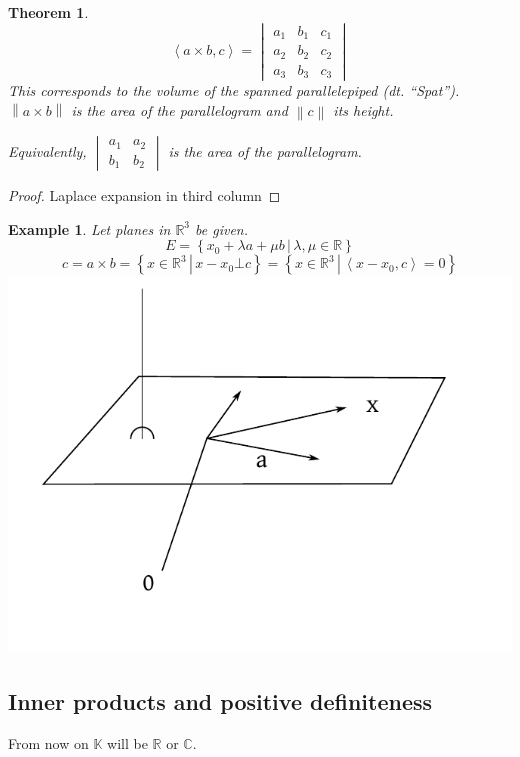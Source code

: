 \documentclass{article}
\newcounter{lecref}[section]
\numberwithin{lecref}{section}
\newtheorem{theorem}[lecref]{Theorem}
\newtheorem{example}[lecref]{Example}
\newcommand{\setdef}[2]{\left\{\left.#1\,\right|\,#2\right\}}
\newcommand{\angel}[1]{\left\langle#1\right\rangle}
\newcommand{\norm}[1]{\left\|#1\right\|}
\begin{document}
\begin{theorem} %
  \[ \angel{a \times b, c} = \begin{vmatrix} a_1 & b_1 & c_1 \\ a_2 & b_2 & c_2 \\ a_3 & b_3 & c_3 \end{vmatrix} \]
  This corresponds to the volume of the spanned parallelepiped (dt. \foreignlanguage{german}{\enquote{Spat}}).
  $\norm{a \times b}$ is the area of the parallelogram and $\norm{c}$ its height.

  Equivalently, $\begin{vmatrix} a_1 & a_2 \\ b_1 & b_2 \end{vmatrix}$ is the area of the parallelogram.
\end{theorem}

\begin{proof}
  Laplace expansion in third column
\end{proof}

\begin{example} %
  Let planes in $\mathbb R^3$ be given.
  \[ E = \setdef{x_0 + \lambda a + \mu b}{\lambda, \mu \in \mathbb R} \]
  \[ c = a \times b = \setdef{x \in \mathbb R^3}{x - x_0 \bot c} = \setdef{x \in \mathbb R^3}{\angel{x - x_0, c} = 0} \]
  \includegraphics{img/05_application.pdf} %
\end{example}

\subsection{Inner products and positive definiteness}
From now on $\mathbb K$ will be $\mathbb R$ or $\mathbb C$.
\end{document}
